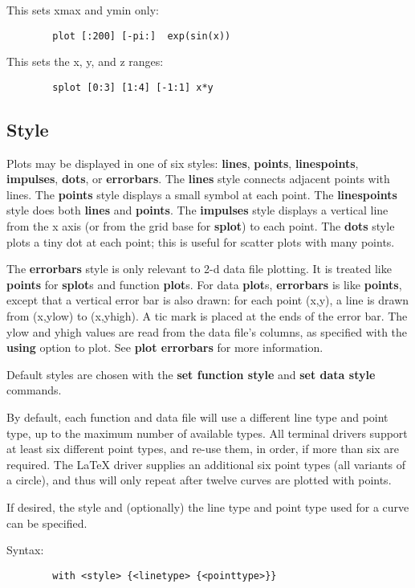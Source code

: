 This sets xmax and ymin only:
\begin{verbatim}
        plot [:200] [-pi:]  exp(sin(x))
\end{verbatim}

This sets the x, y, and z ranges:
\begin{verbatim}
        splot [0:3] [1:4] [-1:1] x*y
\end{verbatim}
\subsection{Style}
Plots may be displayed in one of six styles: {\bf lines}, {\bf points},
{\bf linespoints}, {\bf impulses}, {\bf dots}, or {\bf errorbars}. The {\bf lines} style
connects adjacent points with lines. The {\bf points} style displays a
small symbol at each point. The {\bf linespoints} style does both
{\bf lines} and {\bf points}. The {\bf impulses} style displays a vertical line
from the x axis (or from the grid base for {\bf splot}) to each point. The
{\bf dots} style plots a tiny dot at each point; this is useful for
scatter plots with many points.

The {\bf errorbars} style is only relevant to 2-d data file plotting. It
is treated like {\bf points} for {\bf splot}s and function {\bf plot}s. For data
{\bf plot}s, {\bf errorbars} is like {\bf points}, except that a vertical error 
bar is also drawn: for each point (x,y), a line is drawn from
(x,ylow) to (x,yhigh). A tic mark is placed at the ends of the error
bar. The ylow and yhigh values are read from the data file's columns,
as specified with the {\bf using} option to plot. See {\bf plot errorbars} for
more information.

Default styles are chosen with the {\bf set function style} and
{\bf set data style} commands.

By default, each function and data file will use a different 
line type and point type, up to the maximum number of available 
types. All terminal drivers support at least six different point
types, and re-use them, in order, if more than six are required.
The LaTeX driver supplies an additional six point types (all variants
of a circle), and thus will only repeat after twelve curves are
plotted with points.

If desired, the style and (optionally) the line type and point type
used for a curve can be specified.

Syntax:

\begin{verbatim}
        with <style> {<linetype> {<pointtype>}}
\end{verbatim}

